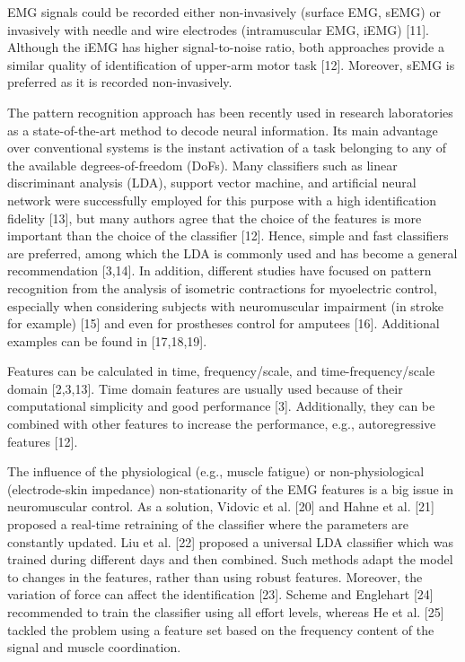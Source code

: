 EMG signals could be recorded either non-invasively (surface EMG, sEMG) or invasively with needle and wire electrodes (intramuscular EMG, iEMG) [11]. Although the iEMG has higher signal-to-noise ratio, both approaches provide a similar quality of identification of upper-arm motor task [12]. Moreover, sEMG is preferred as it is recorded non-invasively.

The pattern recognition approach has been recently used in research laboratories as a state-of-the-art method to decode neural information. Its main advantage over conventional systems is the instant activation of a task belonging to any of the available degrees-of-freedom (DoFs). Many classifiers such as linear discriminant analysis (LDA), support vector machine, and artificial neural network were successfully employed for this purpose with a high identification fidelity [13], but many authors agree that the choice of the features is more important than the choice of the classifier [12]. Hence, simple and fast classifiers are preferred, among which the LDA is commonly used and has become a general recommendation [3,14]. In addition, different studies have focused on pattern recognition from the analysis of isometric contractions for myoelectric control, especially when considering subjects with neuromuscular impairment (in stroke for example) [15] and even for prostheses control for amputees [16]. Additional examples can be found in [17,18,19].

Features can be calculated in time, frequency/scale, and time-frequency/scale domain [2,3,13]. Time domain features are usually used because of their computational simplicity and good performance [3]. Additionally, they can be combined with other features to increase the performance, e.g., autoregressive features [12].

The influence of the physiological (e.g., muscle fatigue) or non-physiological (electrode-skin impedance) non-stationarity of the EMG features is a big issue in neuromuscular control. As a solution, Vidovic et al. [20] and Hahne et al. [21] proposed a real-time retraining of the classifier where the parameters are constantly updated. Liu et al. [22] proposed a universal LDA classifier which was trained during different days and then combined. Such methods adapt the model to changes in the features, rather than using robust features.
Moreover, the variation of force can affect the identification [23]. Scheme and Englehart [24] recommended to train the classifier using all effort levels, whereas He et al. [25] tackled the problem using a feature set based on the frequency content of the signal and muscle coordination.

